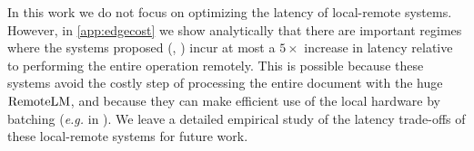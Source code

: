 In this work we do not focus on optimizing the latency of local-remote systems.
However, in \cref{app:edgecost} we show analytically that there are important regimes where the systems proposed (\naive, \system) incur at most a $5\times$ increase in latency relative to performing the entire operation remotely.
This is possible because these systems avoid the costly step of processing the entire document with the huge $\mathrm{RemoteLM}$, and because they can make efficient use of the local hardware by batching (\textit{e.g.} in \system).
We leave a detailed empirical study of the latency trade-offs of these local-remote systems for future work.












